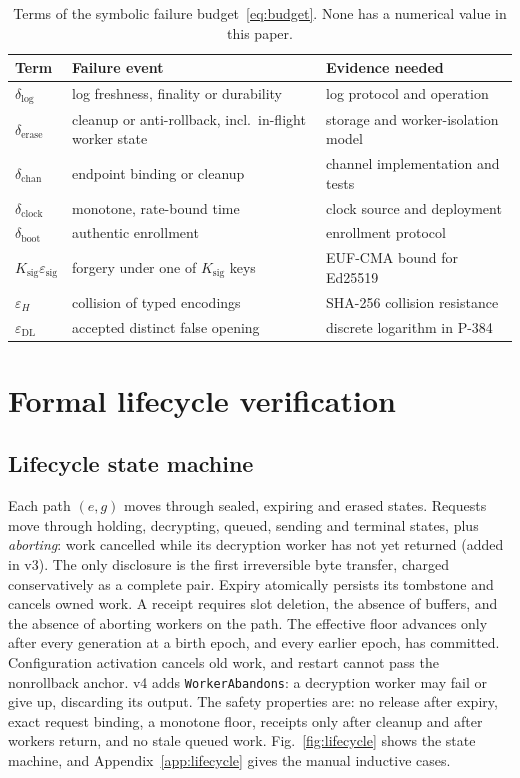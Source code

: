 \documentclass[pdflatex,sn-mathphys-num,twocolumn]{sn-jnl}
\theoremstyle{plain}
\theoremstyle{definition}
\newcommand{\code}[1]{\texttt{#1}}
\begin{document}
\begin{table}[htbp]
\caption{Terms of the symbolic failure budget~\eqref{eq:budget}. None has a numerical value in this paper.}\label{tab:budget}
\centering\footnotesize
\begin{tabularx}{\linewidth}{@{}>{\raggedright\arraybackslash}p{.17\linewidth}>{\raggedright\arraybackslash}p{.38\linewidth}Y@{}}\toprule
Term & Failure event & Evidence needed\\\midrule
$\delta_{\mathrm{log}}$ & log freshness, finality or durability & log protocol and operation\\
$\delta_{\mathrm{erase}}$ & cleanup or anti-rollback, incl.\ in-flight worker state & storage and worker-isolation model\\
$\delta_{\mathrm{chan}}$ & endpoint binding or cleanup & channel implementation and tests\\
$\delta_{\mathrm{clock}}$ & monotone, rate-bound time & clock source and deployment\\
$\delta_{\mathrm{boot}}$ & authentic enrollment & enrollment protocol\\
$K_{\mathrm{sig}}\varepsilon_{\mathrm{sig}}$ & forgery under one of $K_{\mathrm{sig}}$ keys & EUF-CMA bound for Ed25519\\
$\varepsilon_H$ & collision of typed encodings & SHA-256 collision resistance\\
$\varepsilon_{\mathrm{DL}}$ & accepted distinct false opening & discrete logarithm in P-384\\\bottomrule
\end{tabularx}
\end{table}


\section{Formal lifecycle verification}\label{sec:formal}

\subsection{Lifecycle state machine}
Each path $(e,g)$ moves through sealed, expiring and erased states. Requests move through holding, decrypting, queued, sending and terminal states, plus \emph{aborting}: work cancelled while its decryption worker has not yet returned (added in v3). The only disclosure is the first irreversible byte transfer, charged conservatively as a complete pair. Expiry atomically persists its tombstone and cancels owned work. A receipt requires slot deletion, the absence of buffers, and the absence of aborting workers on the path. The effective floor advances only after every generation at a birth epoch, and every earlier epoch, has committed. Configuration activation cancels old work, and restart cannot pass the nonrollback anchor. v4 adds \code{WorkerAbandons}: a decryption worker may fail or give up, discarding its output. The safety properties are: no release after expiry, exact request binding, a monotone floor, receipts only after cleanup and after workers return, and no stale queued work. Fig.~\ref{fig:lifecycle} shows the state machine, and Appendix~\ref{app:lifecycle} gives the manual inductive cases.
\end{document}
